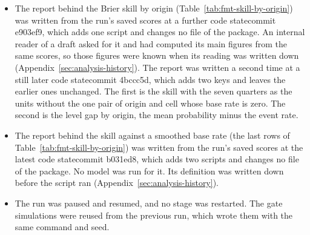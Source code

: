 \begin{itemize}
\item The report behind the Brier skill by origin (Table~\ref{tab:fmt-skill-by-origin}) was written from the run's saved scores at \iftmlr a further code state\else commit e903ef9\fi, which adds one script and changes no file of the package. An internal reader of a draft asked for it and had computed its main figures from the same scores, so those figures were known when its reading was written down (Appendix~\ref{sec:analysis-history}). The report was written a second time at \iftmlr a still later code state\else commit 4bccc5d\fi, which adds two keys and leaves the earlier ones unchanged. The first is the skill with the seven quarters as the units without the one pair of origin and cell whose base rate is zero. The second is the level gap by origin, the mean probability minus the event rate.
\item The report behind the skill against a smoothed base rate (the last rows of Table~\ref{tab:fmt-skill-by-origin}) was written from the run's saved scores at \iftmlr the latest code state\else commit b031ed8\fi, which adds two scripts and changes no file of the package. No model was run for it. Its definition was written down before the script ran (Appendix~\ref{sec:analysis-history}).
\item The run was paused and resumed, and no stage was restarted. The gate simulations were reused from the previous run, which wrote them with the same command and seed.

\end{itemize}
